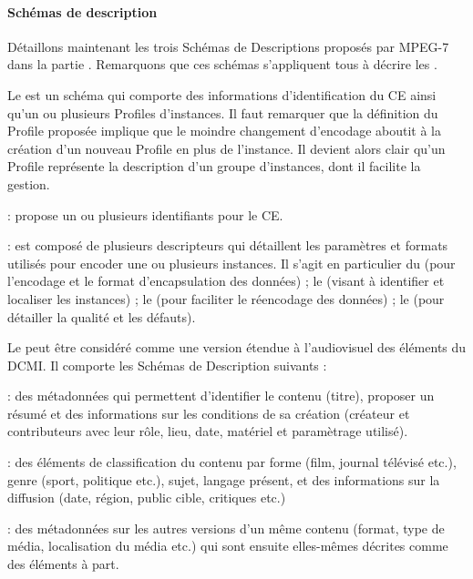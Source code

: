 \paragraph{Schémas de description}
Détaillons maintenant les trois Schémas de Descriptions proposés par MPEG-7 dans la partie .
Remarquons que ces schémas s'appliquent tous à décrire les .

Le  est un schéma qui comporte des informations d'identification du CE ainsi qu'un ou plusieurs Profiles d'instances. 
Il faut remarquer que la définition du Profile proposée implique que le moindre changement d'encodage aboutit à la création d'un nouveau Profile en plus de l'instance. 
Il devient alors clair qu'un Profile représente la description d'un groupe d'instances, dont il facilite la gestion.
\begin{liste}
	\item {} : propose un ou plusieurs identifiants pour le CE.
	\item {} : est composé de plusieurs descripteurs qui détaillent les paramètres et formats utilisés pour encoder une ou plusieurs instances.
	Il s'agit en particulier du  (pour l'encodage et le format d'encapsulation des données) ; le  (visant à identifier et localiser les instances) ; le  (pour faciliter le réencodage des données) ; le  (pour détailler la qualité et les défauts). 
\end{liste}


Le  peut être considéré comme une version étendue à l'audiovisuel des éléments du DCMI. Il comporte les Schémas de Description suivants : 
	\begin{liste}
		\item {} : des métadonnées qui permettent d'identifier le contenu (titre), proposer un résumé et des informations sur les conditions de sa création (créateur et contributeurs avec leur rôle, lieu, date, matériel et paramètrage utilisé).

		\item {} : des éléments de classification du contenu par forme (film, journal télévisé etc.), genre (sport, politique etc.), sujet, langage présent, et des informations sur la diffusion (date, région, public cible, critiques etc.)

		\item {} : des métadonnées sur les autres versions d'un même contenu (format, type de média, localisation du média etc.) qui sont ensuite elles-mêmes décrites comme des éléments à part.
	\end{liste}




